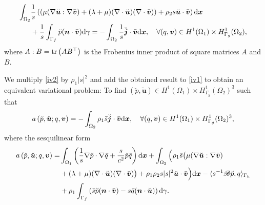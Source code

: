 \documentclass[final,leqno]{siamltex}
\begin{document}
\begin{align} \label{iv2}
 \int_{\Omega_2} & \frac{1}{s}\left(\left( \mu (\nabla {\breve {\boldsymbol
u}}: \nabla \bar {\boldsymbol v}) + (\lambda+\mu ) (\nabla \cdot \breve
{\boldsymbol u}) (\nabla \cdot \bar
{\boldsymbol v})\right) + \rho_2 s  \breve {\boldsymbol u} \cdot \bar
{\boldsymbol v} \right) {\rm d} \boldsymbol x \notag\\
& +\frac{1}{s} \int_{\Gamma_f} \breve  p (\boldsymbol n \cdot \bar {\boldsymbol
v}){\rm d} \gamma= - \int_{\Omega_2} \frac{1}{s} \breve {\boldsymbol j} \cdot
\bar {\boldsymbol v} {\rm d} \boldsymbol x,\quad\forall (q, \boldsymbol v)\in
H^1(\Omega_1)\times H^1_{\Gamma_g}(\Omega_2),
\end{align}
where $A:B= {\rm tr} \left( A B^{\top}\right)$ is the Frobenius inner product of
square matrices $A$ and $B$.

We multiply \eqref{iv2} by $\rho_1 |s|^2$ and add the obtained result to \eqref{iv1} to obtain an
equivalent variational problem: To find $(\breve p, \breve {\boldsymbol u}) \in
H^1(\Omega_1) \times H_{\Gamma_g}^1 (\Omega_2)^3$  such that
\begin{align}\label{ivp}
 a\left( \breve p, \breve {\boldsymbol u}; q, \boldsymbol v \right) =
 -\int_{\Omega_2}   \rho_1 \bar s   \breve  {\boldsymbol j} \cdot \bar
{\boldsymbol v} {\rm d} \boldsymbol  x, \quad \forall (q, \boldsymbol v) \in
H^1(\Omega_1) \times H_{\Gamma_g}^1
(\Omega_2)^3,
\end{align}
where the sesquilinear form
\begin{align}
 a\left( \breve p, \breve {\boldsymbol u}; q, \boldsymbol v \right)=
 &  \int_{\Omega_1} \left( \frac{1}{s}  \nabla \breve p \cdot \nabla {\bar q}  +
\frac{s}{c^2} \breve p \bar q  \right) {\rm d} \boldsymbol x + \int_{\Omega_2}
\Big( \rho_1 \bar s\big( \mu (\nabla {\breve {\boldsymbol
u}} : \nabla \bar {\boldsymbol v}) \notag\\
& + (\lambda+\mu ) (\nabla \cdot \breve {\boldsymbol u}) (\nabla \cdot \bar
{\boldsymbol v})\big) + \rho_1 \rho_2 s |s|^2  \breve {\boldsymbol u} \cdot \bar
{\boldsymbol v}  \Big) {\rm d} \boldsymbol  x -\langle s^{-1} \mathscr{B}\breve
p, q \rangle_{\Gamma_h}\notag\\
&+\rho_1 \int_{\Gamma_f} \left( \bar s  \breve p (\boldsymbol n \cdot \bar
{\boldsymbol v}) -s  \bar q (\boldsymbol n \cdot \breve {\boldsymbol u}) \right)
{\rm d} \gamma. \label{slf}
\end{align}
\end{document}
